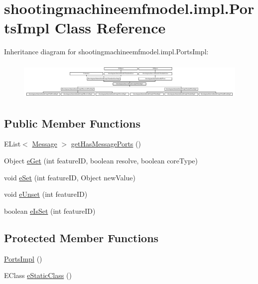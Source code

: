 \hypertarget{classshootingmachineemfmodel_1_1impl_1_1_ports_impl}{\section{shootingmachineemfmodel.\-impl.\-Ports\-Impl Class Reference}
\label{classshootingmachineemfmodel_1_1impl_1_1_ports_impl}
}
Inheritance diagram for shootingmachineemfmodel.\-impl.\-Ports\-Impl\-:\begin{figure}[H]
\begin{center}
\leavevmode
\includegraphics[height=1.872910cm]{classshootingmachineemfmodel_1_1impl_1_1_ports_impl}
\end{center}
\end{figure}
\subsection*{Public Member Functions}
\begin{DoxyCompactItemize}
\item 
E\-List$<$ \hyperlink{interfaceshootingmachineemfmodel_1_1_message}{Message} $>$ \hyperlink{classshootingmachineemfmodel_1_1impl_1_1_ports_impl_ac4f2c6f54b5cf2398359e3290ddeb01e}{get\-Has\-Message\-Ports} ()
\item 
Object \hyperlink{classshootingmachineemfmodel_1_1impl_1_1_ports_impl_ac88017314b3fd0bb76ba9cf750a476c6}{e\-Get} (int feature\-I\-D, boolean resolve, boolean core\-Type)
\item 
void \hyperlink{classshootingmachineemfmodel_1_1impl_1_1_ports_impl_ac3c0b53cdf75fbd99f4c35c84d0b56cd}{e\-Set} (int feature\-I\-D, Object new\-Value)
\item 
void \hyperlink{classshootingmachineemfmodel_1_1impl_1_1_ports_impl_a39689d056a5cc80fe12f0893e143b87c}{e\-Unset} (int feature\-I\-D)
\item 
boolean \hyperlink{classshootingmachineemfmodel_1_1impl_1_1_ports_impl_a0e44635bf6489a6964af2133cb53b069}{e\-Is\-Set} (int feature\-I\-D)
\end{DoxyCompactItemize}
\subsection*{Protected Member Functions}
\begin{DoxyCompactItemize}
\item 
\hyperlink{classshootingmachineemfmodel_1_1impl_1_1_ports_impl_a93553b53e80e12d834f5e34ef1e5123c}{Ports\-Impl} ()
\item 
E\-Class \hyperlink{classshootingmachineemfmodel_1_1impl_1_1_ports_impl_a76916896463ccf51aa6d3c429ec615c9}{e\-Static\-Class} ()
\end{DoxyCompactItemize}

